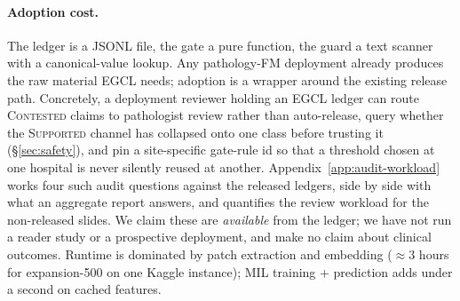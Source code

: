 \documentclass{article}
\newcommand{\SafeNum}[1]{#1}
\begin{document}
\paragraph{Adoption cost.} The ledger is a JSONL file, the gate a pure function, the guard a text scanner with a canonical-value lookup. Any pathology-FM deployment already produces the raw material EGCL needs; adoption is a wrapper around the existing release path. Concretely, a deployment reviewer holding an EGCL ledger can route \textsc{Contested} claims to pathologist review rather than auto-release, query whether the \textsc{Supported} channel has collapsed onto one class before trusting it (\S\ref{sec:safety}), and pin a site-specific gate-rule id so that a threshold chosen at one hospital is never silently reused at another. Appendix~\ref{app:audit-workload} works four such audit questions against the released ledgers, side by side with what an aggregate report answers, and quantifies the review workload for the non-released slides. We claim these are \emph{available} from the ledger; we have not run a reader study or a prospective deployment, and make no claim about clinical outcomes. Runtime is dominated by patch extraction and embedding ($\approx \SafeNum{3}$ hours for expansion-500 on one Kaggle instance); MIL training + prediction adds under a second on cached features.
\end{document}
